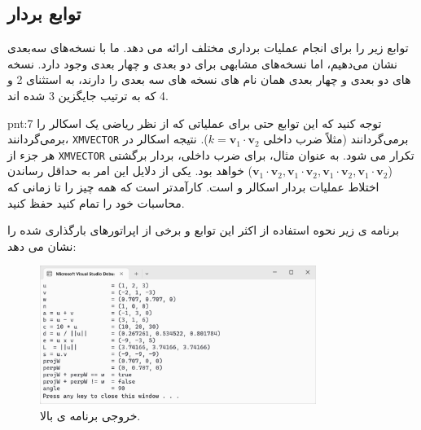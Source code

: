 \subsection{\textbf{توابع بردار}}
{
    \Large
    \begin{spacing}{1.5}
         توابع زیر را برای انجام عملیات برداری مختلف ارائه می دهد.
        ما با نسخه‌های سه‌بعدی نشان می‌دهیم، اما نسخه‌های مشابهی برای دو بعدی و چهار بعدی وجود دارد.
        نسخه های دو بعدی و چهار بعدی همان نام های نسخه های سه بعدی را دارند، به استثنای 2 و 4 که به ترتیب جایگزین 3 شده اند.
        \textbf{\vspace{6pt}}
        \lr{}
        \textbf{\vspace{-20pt}}
        \begin{point}{pnt:7}
            \Large
            توجه کنید که این توابع حتی برای عملیاتی که از نظر ریاضی یک اسکالر را برمی‌گردانند، \texttt{XMVECTOR} برمی‌گردانند (مثلاً ضرب داخلی $k=\textbf{v}_{1}\cdot\textbf{v}_{2}$).
            نتیجه اسکالر در هر جزء از \texttt{XMVECTOR} تکرار می شود. به عنوان مثال، برای ضرب داخلی، بردار برگشتی ($\textbf{v}_{1}\cdot\textbf{v}_{2},\textbf{v}_{1}\cdot\textbf{v}_{2},\textbf{v}_{1}\cdot\textbf{v}_{2},\textbf{v}_{1}\cdot\textbf{v}_{2}$) خواهد بود.
            یکی از دلایل این امر به حداقل رساندن اختلاط عملیات بردار اسکالر و  است.
            کارآمدتر است که همه چیز  را تا زمانی که محاسبات خود را تمام کنید حفظ کنید.
        \end{point}
        \textbf{\vspace{6pt}}
        برنامه ی زیر نحوه استفاده از اکثر این توابع و برخی از اپراتورهای بارگذاری شده را نشان می دهد:
        \textbf{\vspace{6pt}}
        \lr{}
        \textbf{\vspace{-30pt}}
        \begin{figure}[H]
            \centering
            \setlength{\belowcaptionskip}{-10pt}
            \includegraphics[width=0.8\textwidth]{Images/4/4.Session.1.1.19}
            \caption {خروجی برنامه ی بالا.}
            \label{fig:4.Session.1.1.19}
        \end{figure}
        \textbf{\vspace{-30pt}}


\end{spacing}}
